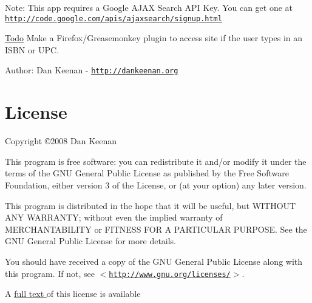 \begin{Desc}
\item[Note:]This app requires a Google AJAX Search API Key. You can get one at \href{http://code.google.com/apis/ajaxsearch/signup.html}{\tt http://code.google.com/apis/ajaxsearch/signup.html}\end{Desc}
\begin{Desc}
\item[\hyperlink{todo__todo000001}{Todo}]Make a Firefox/Greasemonkey plugin to access site if the user types in an ISBN or UPC.\end{Desc}
\begin{Desc}
\item[Author:]Dan Keenan - \href{http://dankeenan.org}{\tt http://dankeenan.org} \end{Desc}
\hypertarget{index_license}{}\section{License}\label{index_license}
Copyright \copyright 2008 Dan Keenan

This program is free software: you can redistribute it and/or modify it under the terms of the GNU General Public License as published by the Free Software Foundation, either version 3 of the License, or (at your option) any later version.

This program is distributed in the hope that it will be useful, but WITHOUT ANY WARRANTY; without even the implied warranty of MERCHANTABILITY or FITNESS FOR A PARTICULAR PURPOSE. See the GNU General Public License for more details.

You should have received a copy of the GNU General Public License along with this program. If not, see $<$\href{http://www.gnu.org/licenses/}{\tt http://www.gnu.org/licenses/}$>$.



A \hyperlink{license}{full text } of this license is available 